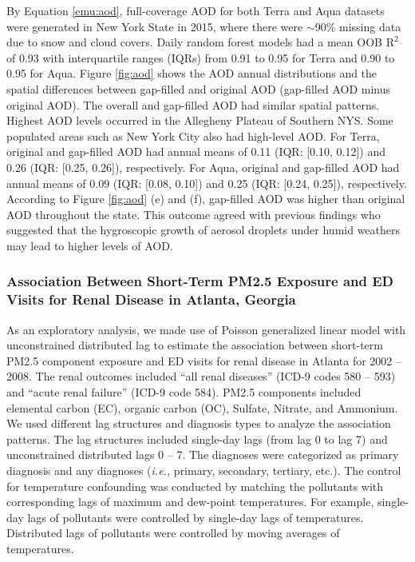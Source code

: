 \documentclass[11pt]{article}
\begin{document}
By Equation \ref{emu:aod}, full-coverage AOD for both Terra and Aqua datasets were generated in New York State in 2015, where there were $\sim$90\% missing data due to snow and cloud covers. Daily random forest models had a mean OOB $\mathrm{R^2}$ of 0.93 with interquartile ranges (IQRs) from 0.91 to 0.95 for Terra and 0.90 to 0.95 for Aqua. Figure \ref{fig:aod} shows the AOD annual distributions and the spatial differences between gap-filled and original AOD (gap-filled AOD minus original AOD). The overall and gap-filled AOD had similar spatial patterns. Highest AOD levels occurred in the Allegheny Plateau of Southern NYS. Some populated areas such as New York City also had high-level AOD. For Terra, original and gap-filled AOD had annual means of 0.11 (IQR: [0.10, 0.12]) and 0.26 (IQR: [0.25, 0.26]), respectively. For Aqua, original and gap-filled AOD had annual means of 0.09 (IQR: [0.08, 0.10]) and 0.25 (IQR: [0.24, 0.25]), respectively. According to Figure \ref{fig:aod} (e) and (f), gap-filled AOD was higher than original AOD throughout the state. This outcome agreed with previous findings \citep{Green2015, Belle2017, Xiao2017} who suggested that the hygroscopic growth of aerosol droplets under humid weathers may lead to higher levels of AOD. 

\subsubsection{Association Between Short-Term PM2.5 Exposure and ED Visits for Renal Disease in Atlanta, Georgia}
As an exploratory analysis, we made use of Poisson generalized linear model with unconstrained distributed lag to estimate the association between short-term PM2.5 component exposure and ED visits for renal disease in Atlanta for 2002 -- 2008. The renal outcomes included ``all renal diseases'' (ICD-9 codes 580 -- 593) and ``acute renal failure'' (ICD-9 code 584). PM2.5 components included elemental carbon (EC), organic carbon (OC), Sulfate, Nitrate, and Ammonium. We used different lag structures and diagnosis types to analyze the association patterns. The lag structures included single-day lags (from lag 0 to lag 7) and unconstrained distributed lags 0 -- 7. The diagnoses were categorized as primary diagnosis and any diagnoses (\textit{i.e.,} primary, secondary, tertiary, etc.). The control for temperature confounding was conducted by matching the pollutants with corresponding lags of maximum and dew-point temperatures. For example, single-day lags of pollutants were controlled by single-day lags of temperatures. Distributed lags of pollutants were controlled by moving averages of temperatures. 
\end{document}
